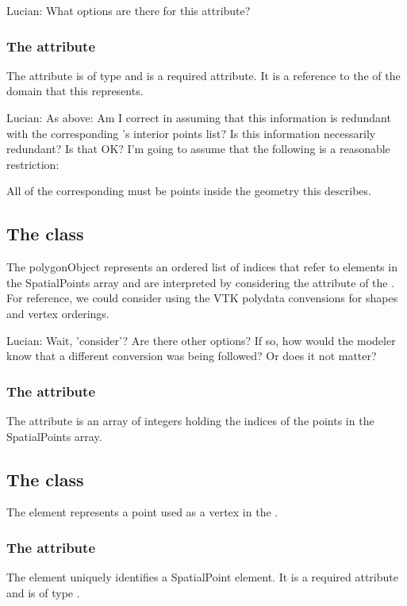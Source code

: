 {\color{red} Lucian: \notice What options are there for this attribute?}

\subsubsection{The  attribute}
The  attribute is of type  and is a required attribute. It is a reference to the  of the domain that this \ParametricObject represents.

{\color{red} Lucian: \notice As above:  Am I correct in assuming that this information is redundant with the corresponding \Domain's interior points list?  Is this information necessarily redundant?  Is that OK?  I'm going to assume that the following is a reasonable restriction:}

All \InteriorPoints of the corresponding \Domain must be points inside the geometry this \ParametricObject describes.


\subsection{The  class}
\label{PolygonObject-class}
The polygonObject represents an ordered list of indices that refer to elements in the SpatialPoints array and are interpreted by considering the  attribute of the \ParametricObject.  For reference, we could consider using the VTK polydata convensions for shapes and vertex orderings.

{\color{red} Lucian: \notice Wait, 'consider'?  Are there other options?  If so, how would the modeler know that a different conversion was being followed?  Or does it not matter?}


\subsubsection{The  attribute}
The  attribute is an array of integers holding the indices of the points in the SpatialPoints array.


\subsection{The  class}
\label{SpatialPoint-class}
The \SpatialPoint element represents a point used as a vertex in the \ParametricGeometry.

\subsubsection{The  attribute}
The  element uniquely identifies a SpatialPoint element. It is a required attribute and is of type .

